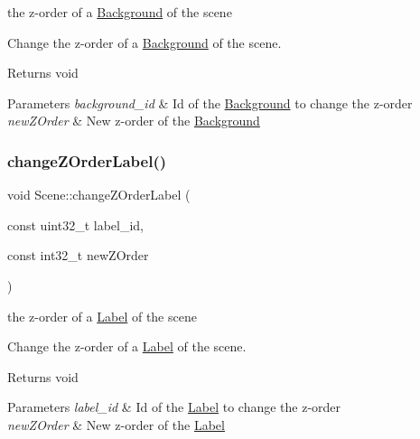 the z-\/order of a \hyperlink{class_background}{Background} of the scene

Change the z-\/order of a \hyperlink{class_background}{Background} of the scene.

\begin{DoxyReturn}{Returns}
void 
\end{DoxyReturn}

\begin{DoxyParams}{Parameters}
{\em background\+\_\+id} & Id of the \hyperlink{class_background}{Background} to change the z-\/order \\
\hline
{\em new\+Z\+Order} & New z-\/order of the \hyperlink{class_background}{Background} \\
\hline
\end{DoxyParams}
\mbox{\label{class_scene_ac7dc181963c83afe8d3863e4226a3bd2}} 
\subsubsection{\texorpdfstring{change\+Z\+Order\+Label()}{changeZOrderLabel()}}
{\footnotesize\ttfamily void Scene\+::change\+Z\+Order\+Label (\begin{DoxyParamCaption}\item[{const uint32\+\_\+t}]{label\+\_\+id,  }\item[{const int32\+\_\+t}]{new\+Z\+Order }\end{DoxyParamCaption})}

the z-\/order of a \hyperlink{class_label}{Label} of the scene

Change the z-\/order of a \hyperlink{class_label}{Label} of the scene.

\begin{DoxyReturn}{Returns}
void 
\end{DoxyReturn}

\begin{DoxyParams}{Parameters}
{\em label\+\_\+id} & Id of the \hyperlink{class_label}{Label} to change the z-\/order \\
\hline
{\em new\+Z\+Order} & New z-\/order of the \hyperlink{class_label}{Label} \\
\hline
\end{DoxyParams}
\mbox{\label{class_scene_aee2976ddb158bde51704f40cf0266e10}} 
